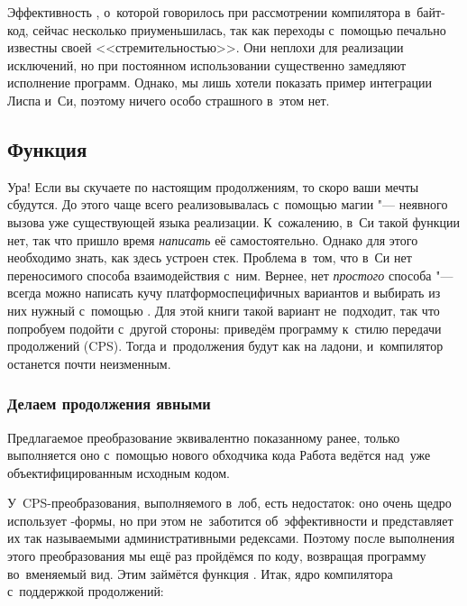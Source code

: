 Эффективность , о~которой говорилось при рассмотрении компилятора
в~байт-код, сейчас несколько приуменьшилась, так как переходы с~помощью
 печально известны своей <<стремительностью>>. Они неплохи для
реализации исключений, но при постоянном использовании существенно замедляют
исполнение программ. Однако, мы лишь хотели показать пример интеграции Лиспа
и~Си, поэтому ничего особо страшного в~этом нет.


\subsection{\texorpdfstring{Функция~\protect{}}{Функция call/cc}}%
\label{cc/call/cc/ssect:cc}

Ура! Если вы скучаете по настоящим продолжениям, то скоро ваши мечты сбудутся.
До этого  чаще всего реализовывалась с~помощью магии "--- неявного
вызова уже существующей  языка реализации. К~сожалению, в~Си такой
функции нет, так что пришло время \emph{написать} её самостоятельно. Однако для
этого необходимо знать, как здесь устроен стек. Проблема в~том, что в~Си нет
переносимого способа взаимодействия с~ним. Вернее, нет \emph{простого} способа
"--- всегда можно написать кучу платформоспецифичных вариантов и выбирать из них
нужный с~помощью . Для этой книги такой вариант не~подходит, так что
попробуем подойти с~другой стороны: приведём программу к~стилю передачи
продолжений (CPS). Тогда и~продолжения будут как на ладони, и~компилятор
останется почти неизменным.


\subsubsection{Делаем продолжения явными}\label{cc/call/cc/cc/ssect:explicit}

Предлагаемое преобразование эквивалентно показанному ранее, только выполняется
оно с~помощью нового обходчика кода 
Работа ведётся над~уже объектифицированным исходным кодом.

У~CPS-преобразования, выполняемого в~лоб, есть недостаток: оно очень щедро
использует -формы, но при этом не~заботится об~эффективности и
представляет их так называемыми административными редексами. Поэтому после
выполнения этого преобразования мы ещё раз пройдёмся по коду, возвращая
программу во~вменяемый вид. Этим займётся функция . Итак, ядро
компилятора с~поддержкой продолжений:

